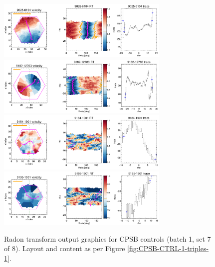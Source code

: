 \documentclass[fleqn,usenatbib]{mnras}
\begin{document}
\begin{figure}
    \centering
    \includegraphics[width=0.73\textwidth]{Images/SN1-MC250/CPSB-CTRL-1-triples/9025-6104-1-250-10.png}
    \includegraphics[width=0.73\textwidth]{Images/SN1-MC250/CPSB-CTRL-1-triples/9182-12703-1-250-10.png}
    \includegraphics[width=0.73\textwidth]{Images/SN1-MC250/CPSB-CTRL-1-triples/9184-1901-1-250-10.png}
    \includegraphics[width=0.73\textwidth]{Images/SN1-MC250/CPSB-CTRL-1-triples/9195-1901-1-250-10.png}
    \caption{Radon transform output graphics for CPSB controls (batch 1, set 7 of 8). Layout and content as per Figure \ref{fig:CPSB-CTRL-1-triples-1}.}
    \label{fig:CPSB-CTRL-1-triples-7}
\end{figure}
\end{document}
